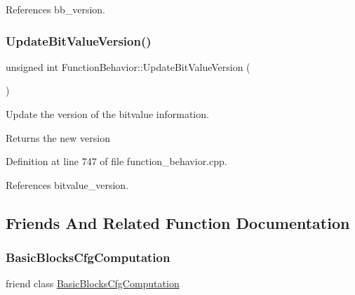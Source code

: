 References bb\+\_\+version.

\mbox{\label{classFunctionBehavior_a3c729f84a47cbe62a10bfd85d283ade2}} 
\subsubsection{\texorpdfstring{Update\+Bit\+Value\+Version()}{UpdateBitValueVersion()}}
{\footnotesize\ttfamily unsigned int Function\+Behavior\+::\+Update\+Bit\+Value\+Version (\begin{DoxyParamCaption}{ }\end{DoxyParamCaption})}



Update the version of the bitvalue information. 

\begin{DoxyReturn}{Returns}
the new version 
\end{DoxyReturn}


Definition at line 747 of file function\+\_\+behavior.\+cpp.



References bitvalue\+\_\+version.



\subsection{Friends And Related Function Documentation}
\mbox{\label{classFunctionBehavior_a751d28e1fb777a7572350101dc320be8}} 
\subsubsection{\texorpdfstring{Basic\+Blocks\+Cfg\+Computation}{BasicBlocksCfgComputation}}
{\footnotesize\ttfamily friend class \hyperlink{classBasicBlocksCfgComputation}{Basic\+Blocks\+Cfg\+Computation}\hspace{0.3cm}{\ttfamily [friend]}}



